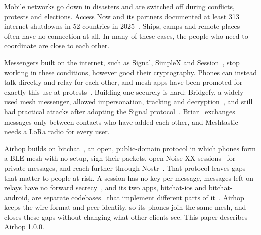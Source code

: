 \documentclass[conference]{IEEEtran}
\begin{document}
Mobile networks go down in disasters and are switched off during conflicts, protests and elections. Access Now and its partners documented at least 313 internet shutdowns in 52 countries in 2025~\cite{keepiton2025}. Ships, camps and remote places often have no connection at all. In many of these cases, the people who need to coordinate are close to each other.

Messengers built on the internet, such as Signal, SimpleX and Session~\cite{doubleratchet,simplex,session2020}, stop working in these conditions, however good their cryptography. Phones can instead talk directly and relay for each other, and mesh apps have been promoted for exactly this use at protests~\cite{bridgefy}. Building one securely is hard: Bridgefy, a widely used mesh messenger, allowed impersonation, tracking and decryption~\cite{bridgefy}, and still had practical attacks after adopting the Signal protocol~\cite{bridgefy2022}. Briar~\cite{briar} exchanges messages only between contacts who have added each other, and Meshtastic~\cite{meshtasticintro} needs a LoRa radio for every user.

Airhop builds on bitchat~\cite{bitchat,bitchatwp}, an open, public-domain protocol in which phones form a BLE mesh with no setup, sign their packets, open Noise XX sessions~\cite{noise} for private messages, and reach further through Nostr~\cite{nip01}. That protocol leaves gaps that matter to people at risk. A session has no key per message, messages left on relays have no forward secrecy~\cite[Sec.~5.3]{bitchatwp}, and its two apps, bitchat-ios and bitchat-android, are separate codebases~\cite{bitchat,bitchatandroid} that implement different parts of it~\cite{airhopspec}. Airhop keeps the wire format and peer identity, so its phones join the same mesh, and closes these gaps without changing what other clients see. This paper describes Airhop 1.0.0.
\end{document}
